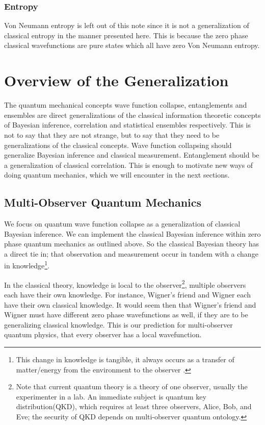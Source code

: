 \documentclass[12pt,a4paper]{article}
\begin{document}
\subsubsection{Entropy}
Von Neumann entropy is left out of this note since it is not a generalization of classical entropy in the manner presented here.  This is because the zero phase classical wavefunctions are pure states which all have zero Von Neumann entropy.

\section{Overview of the Generalization}

The quantum mechanical concepts wave function collapse, entanglements and ensembles are direct generalizations of the classical information theoretic concepts of Bayesian inference, correlation and statistical ensembles respectively.  This is not to say that they are not strange, but to say that they need to be generalizations of the classical concepts.  Wave function collapsing should generalize Bayesian inference and classical measurement.  Entanglement should be a generalization of classical correlation.  This is enough to motivate new ways of doing quantum mechanics, which we will encounter in the next sections.

\subsection{Multi-Observer Quantum Mechanics}
We focus on quantum wave function collapse as a generalization of classical Bayesian inference.  We can implement the classical Bayesian inference within zero phase quantum mechanics as outlined above.  So the classical Bayesian theory has a direct tie in; that observation and measurement occur in tandem with a change in knowledge\footnote{This change in knowledge is tangible, it always occurs as a transfer of matter/energy from the environment to the observer \cite{thrust}.}.  

In the classical theory, knowledge is local to the observer\footnote{Note that current quantum theory is a theory of one observer, usually the experimenter in a lab.  An immediate subject is quantum key distribution(QKD), which requires at least three observers, Alice, Bob, and Eve; the security of QKD depends on multi-observer quantum ontology.}, multiple observers each have their own knowledge.  For instance, Wigner's friend and Wigner each have their own classical knowledge.  It would seem then that Wigner's friend and Wigner must have different zero phase wavefunctions as well, if they are to be generalizing classical knowledge.  This is our prediction for multi-observer quantum physics, that every observer has a local wavefunction. 
\end{document}
